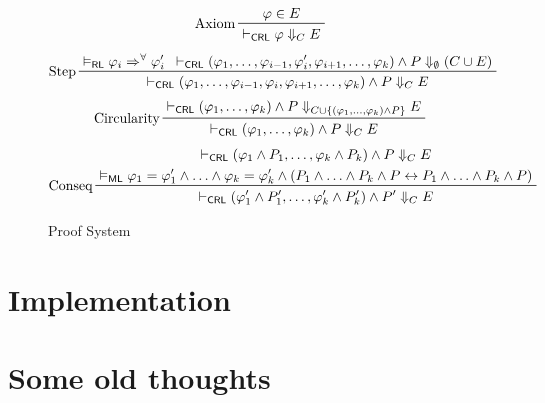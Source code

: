 \documentclass{article}
\newcommand{\RL}{\mathsf{RL}}
\newcommand{\ML}{\mathsf{ML}}
\newcommand{\CRL}{\mathsf{CRL}}
\begin{document}
\begin{figure}
    \centering
    \begin{align*}
    & \prftree[l]{Axiom}{\varphi \in E}{\vdash_\CRL \varphi \Downarrow_{C} E}   \\
    \end{align*}
    \begin{align*}
    & \prftree[l]{Step}
    {\vDash_\RL \varphi_i \Rightarrow^\forall \varphi_i^\prime}
    { \vdash_\CRL (\varphi_1, \ldots, \varphi_{i-1}, \varphi_i^\prime, \varphi_{i+1}, \ldots, \varphi_k)
      \land P
      \Downarrow_{\emptyset} (C \cup E)
    }
    {\vdash_\CRL (\varphi_1, \ldots, \varphi_{i-1}, \varphi_i, \varphi_{i+1}, \ldots, \varphi_k) \land P \Downarrow_{C} E}
    \end{align*}
    \begin{align*}
    & \prftree[l]{Circularity}
      { \vdash_\CRL (\varphi_1, \ldots, \varphi_k) \land P \Downarrow_{C \cup \{ (\varphi_1, \ldots, \varphi_k) \land P \} } E}
      { \vdash_\CRL (\varphi_1, \ldots, \varphi_k) \land P \Downarrow_{C} E}
      \\
    \end{align*}
    \begin{align*}
    & \prftree[l]{Conseq}
      { \prfStackPremises
        { \vdash_\CRL (\varphi_1 \land P_1, \ldots, \varphi_k \land P_k) \land P \Downarrow_{C} E}
        { \vDash_\ML \varphi_1 = \varphi_1^\prime \land \ldots \land \varphi_k = \varphi_k^\prime
        \land (P_1 \land \ldots \land P_k \land P \leftrightarrow P_1 \land \ldots \land P_k \land P) }
      }
      { \vdash_\CRL (\varphi_1^\prime \land P_1^\prime, \ldots, \varphi_k^\prime \land P_k^\prime) \land P^\prime \Downarrow_{C} E}
    \end{align*}
    \caption{Proof System}
    \label{fig:my_label}
\end{figure}

\section{Implementation}




\appendix

\section{Some old thoughts}
\end{document}
